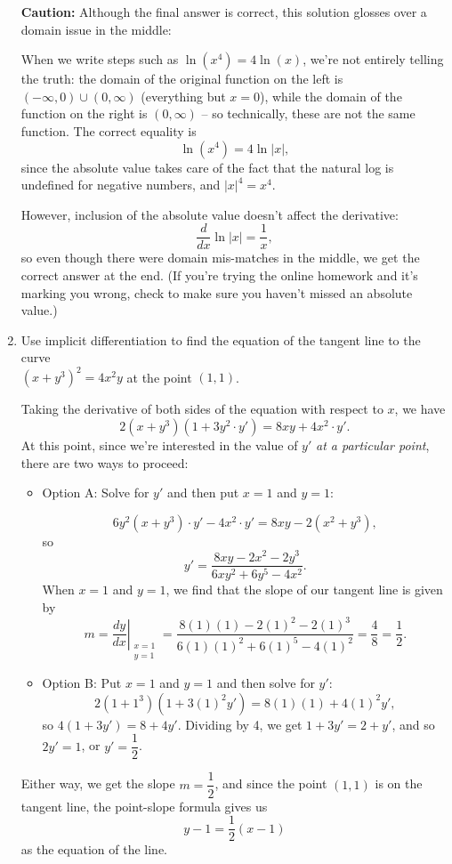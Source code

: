 \documentclass[12pt]{article}
\newcommand{\abs}[1]{\lvert #1\rvert}
\begin{document}
\begin{enumerate}
 \textbf{Caution:} Although the final answer is correct, this solution glosses over a domain issue in the middle:
 
 \medskip
 
 When we write steps such as $\ln(x^4)=4\ln(x)$, we're not entirely telling the truth: the domain of the original function on the left is $(-\infty, 0)\cup (0,\infty)$ (everything but $x=0$), while the domain of the function on the right is $(0,\infty)$ -- so technically, these are not the same function. The correct equality is
 \[
 \ln (x^4)=4\ln\abs{x},
 \]
 since the absolute value takes care of the fact that the natural log is undefined for negative numbers, and $\abs{x}^4=x^4$.
 
 However, inclusion of the absolute value doesn't affect the derivative:
 \[
 \dfrac{d}{dx}\ln\abs{x} = \frac{1}{x},
 \]
  so even though there were domain mis-matches in the middle, we get the correct answer at the end. (If you're trying the online homework and it's marking you wrong, check to make sure you haven't missed an absolute value.)
    \item Use implicit differentiation to find the equation of the tangent line to the curve\\ $(x+y^3)^2=4x^2y$ at the point $(1,1)$.   
    
    Taking the derivative of both sides of the equation with respect to $x$, we have
    \[
    2(x+y^3)(1+3y^2\cdot y')=8xy+4x^2\cdot y'.
    \]
    At this point, since we're interested in the value of $y'$ \textit{at a particular point}, there are two ways to proceed:
    
    \begin{itemize}
    \item Option A: Solve for $y'$ and then put $x=1$ and $y=1$:
    
    \[
    6y^2(x+y^3)\cdot y'-4x^2\cdot y'=8xy-2(x^2+y^3),
    \]
    so
    \[
    y'=\frac{8xy-2x^2-2y^3}{6xy^2+6y^5-4x^2}.
    \]
    When $x=1$ and $y=1$, we find that the slope of our tangent line is given by
    \[
    m = \left.\frac{dy}{dx}\right|_{\substack{x=1\\y=1}} = \frac{8(1)(1)-2(1)^2-2(1)^3}{6(1)(1)^2+6(1)^5-4(1)^2}=\frac{4}{8}=\frac12.
    \]
    
    \item Option B: Put $x=1$ and $y=1$ and then solve for $y'$:
    \[
    2(1+1^3)(1+3(1)^2y')=8(1)(1)+4(1)^2y',
    \]
    so $4(1+3y')=8+4y'$. Dividing by 4, we get $1+3y'=2+y'$, and so $2y'=1$, or $y'=\dfrac12$.
    \end{itemize}
    Either way, we get the slope $m=\dfrac12$, and since the point $(1,1)$ is on the tangent line, the point-slope formula gives us
    \[
    y-1=\frac12(x-1)
    \]
    as the equation of the line.
  \end{enumerate}
\end{document}

